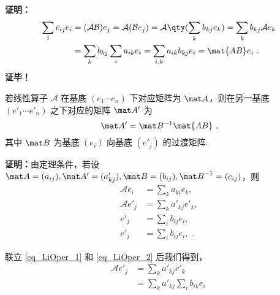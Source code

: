 \textbf{证明：}
\begin{equation}
\begin{aligned}
\sum_i c_{ij} e_i&=(\mathcal{AB}) e_j=\mathcal{A}(\mathcal{B} e_j)=\mathcal{A}\qty(\sum_k b_{kj} e_k)=\sum_k b_{kj}\mathcal{A} e_k\\
&=\sum_k b_{kj}\sum_i a_{ik} e_i=\sum_{i,k}a_{ik}b_{kj} e_i=\mat{AB} e_i~.
\end{aligned}
\end{equation}
\textbf{证毕！}

\begin{theorem}{}\label{the_LiOper_2}
若线性算子 $\mathcal A$ 在基底 $(e_1\cdots e_n)$ 下对应矩阵为 $\mat A$，则在另一基底 $(e'_1\cdots e'_n)$ 之下对应的矩阵 $\mat A'$ 为
\begin{equation}
\mat A'=\mat B^{-1}\mat{AB}~,
\end{equation}
其中 $\mat B$ 为基底 $(e_i)$ 向基底 $(e'_j)$ 的过渡矩阵.
\end{theorem}

\textbf{证明：}由定理条件，若设 $\mat A=(a_{ij}), \mat A'=(a_{kj}'),\mat B=(b_{ij}), {\mat B}^{-1} = (c_{ij})$，则
\begin{align}
\mathcal{A} e_i &= \sum_{k} a_{ki} e_k, \\
\mathcal{A} e'_j &= \sum_{k} a'_{kj} e'_k, \label{eq_LiOper_1} \\
e'_j &= \sum_i b_{ij} e_i, \label{eq_LiOper_2} \\
e'_j &= \sum_i b_{ij} e_i, \label{eq_LiOper_2} ~.
\end{align}

联立 \autoref{eq_LiOper_1} 和 \autoref{eq_LiOper_2} 后我们得到，
\begin{equation}
\begin{aligned}
\mathcal{A} e'_j &= \sum_{k} a'_{kj} e'_k \\
&= \sum_{k} a'_{kj} \sum_i b_{ik} e_i \\
\end{aligned}~
\end{equation}



